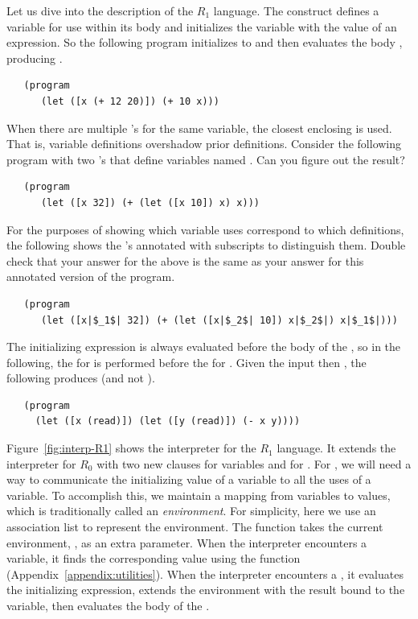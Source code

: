 \documentclass[11pt]{book}
\begin{document}
Let us dive into the description of the $R_1$ language.  The 
construct defines a variable for use within its body and initializes
the variable with the value of an expression.  So the following
program initializes  to  and then evaluates the body
, producing .
\begin{lstlisting}
   (program
      (let ([x (+ 12 20)]) (+ 10 x)))
\end{lstlisting}
When there are multiple 's for the same variable, the closest
enclosing  is used. That is, variable definitions overshadow
prior definitions. Consider the following program with two 's
that define variables named . Can you figure out the result?
\begin{lstlisting}
   (program
      (let ([x 32]) (+ (let ([x 10]) x) x)))
\end{lstlisting}
For the purposes of showing which variable uses correspond to which
definitions, the following shows the 's annotated with subscripts
to distinguish them. Double check that your answer for the above is
the same as your answer for this annotated version of the program.
\begin{lstlisting}
   (program
      (let ([x|$_1$| 32]) (+ (let ([x|$_2$| 10]) x|$_2$|) x|$_1$|)))
\end{lstlisting}
The initializing expression is always evaluated before the body of the
, so in the following, the  for  is
performed before the  for . Given the input
 then , the following produces  (and not
).
\begin{lstlisting}
   (program
     (let ([x (read)]) (let ([y (read)]) (- x y))))
\end{lstlisting}

Figure~\ref{fig:interp-R1} shows the interpreter for the $R_1$
language. It extends the interpreter for $R_0$ with two new
 clauses for variables and for .  For ,
we will need a way to communicate the initializing value of a variable
to all the uses of a variable. To accomplish this, we maintain a
mapping from variables to values, which is traditionally called an
\emph{environment}. For simplicity, here we use an association list to
represent the environment. The  function takes the
current environment, , as an extra parameter.  When the
interpreter encounters a variable, it finds the corresponding value
using the  function (Appendix~\ref{appendix:utilities}).
When the interpreter encounters a , it evaluates the
initializing expression, extends the environment with the result bound
to the variable, then evaluates the body of the .
\end{document}
